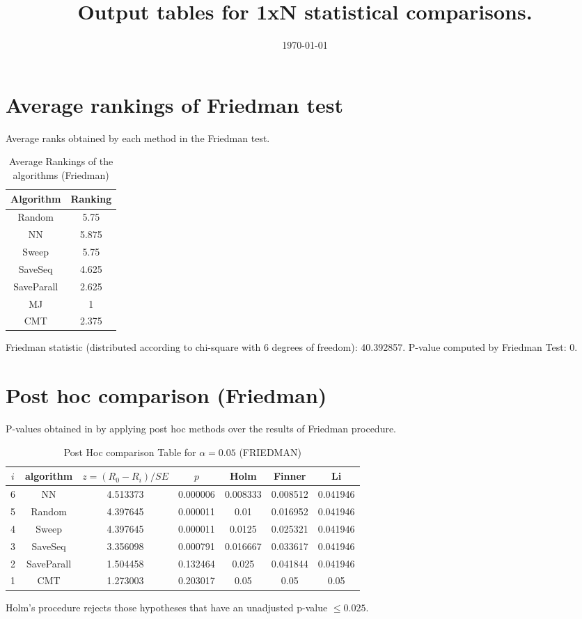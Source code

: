 \documentclass[a4paper,10pt]{article}
\title{Output tables for 1xN statistical comparisons.}
\author{}
\date{\today}
\begin{document}
\begin{landscape}
\pagestyle{empty}
\maketitle
\thispagestyle{empty}

\section{Average rankings of Friedman test}


Average ranks obtained by each method in the Friedman test.

\begin{table}[!htp]
\centering
\begin{tabular}{|c|c|}\hline
Algorithm&Ranking\\\hline
Random&5.75\\NN&5.875\\Sweep&5.75\\SaveSeq&4.625\\SaveParall&2.625\\MJ&1\\CMT&2.375\\\hline\end{tabular}
\caption{Average Rankings of the algorithms (Friedman)}
\end{table}

Friedman statistic (distributed according to chi-square with 6 degrees of freedom): 40.392857. \newline P-value computed by Friedman Test: 0.\newline


\newpage

\section{Post hoc comparison (Friedman)}


P-values obtained in by applying post hoc methods over the results of Friedman procedure.

\begin{table}[!htp]
\centering\footnotesize
\begin{tabular}{ccccccc}
$i$&algorithm&$z=(R_0 - R_i)/SE$&$p$&Holm &Finner&Li\\
\hline6&NN&4.513373&0.000006&0.008333&0.008512&0.041946\\5&Random&4.397645&0.000011&0.01&0.016952&0.041946\\4&Sweep&4.397645&0.000011&0.0125&0.025321&0.041946\\3&SaveSeq&3.356098&0.000791&0.016667&0.033617&0.041946\\2&SaveParall&1.504458&0.132464&0.025&0.041844&0.041946\\1&CMT&1.273003&0.203017&0.05&0.05&0.05\\\hline
\end{tabular}
\caption{Post Hoc comparison Table for $\alpha=0.05$ (FRIEDMAN)}
\end{table}Holm's procedure rejects those hypotheses that have an unadjusted p-value $\le0.025$.


\end{landscape}
\end{document}
